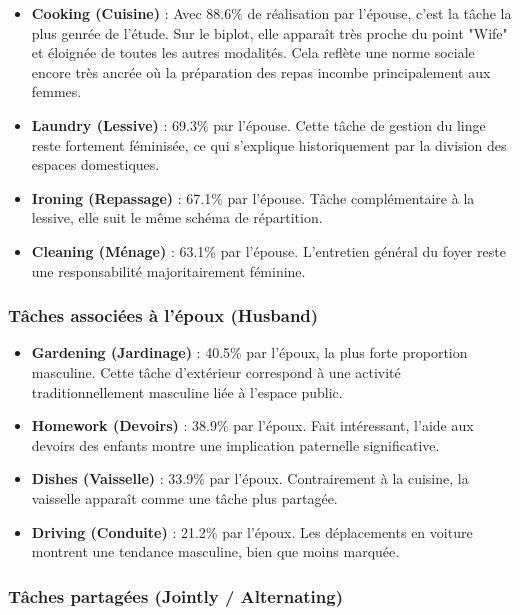 \documentclass[12pt,a4paper]{article}
\begin{document}
\begin{itemize}
    \item \textbf{Cooking (Cuisine)} : Avec 88.6\% de réalisation par l'épouse, c'est la tâche la plus genrée de l'étude. Sur le biplot, elle apparaît très proche du point "Wife" et éloignée de toutes les autres modalités. Cela reflète une norme sociale encore très ancrée où la préparation des repas incombe principalement aux femmes.
    
    \item \textbf{Laundry (Lessive)} : 69.3\% par l'épouse. Cette tâche de gestion du linge reste fortement féminisée, ce qui s'explique historiquement par la division des espaces domestiques.
    
    \item \textbf{Ironing (Repassage)} : 67.1\% par l'épouse. Tâche complémentaire à la lessive, elle suit le même schéma de répartition.
    
    \item \textbf{Cleaning (Ménage)} : 63.1\% par l'épouse. L'entretien général du foyer reste une responsabilité majoritairement féminine.
\end{itemize}

\subsubsection{Tâches associées à l'époux (Husband)}

\begin{itemize}
    \item \textbf{Gardening (Jardinage)} : 40.5\% par l'époux, la plus forte proportion masculine. Cette tâche d'extérieur correspond à une activité traditionnellement masculine liée à l'espace public.
    
    \item \textbf{Homework (Devoirs)} : 38.9\% par l'époux. Fait intéressant, l'aide aux devoirs des enfants montre une implication paternelle significative.
    
    \item \textbf{Dishes (Vaisselle)} : 33.9\% par l'époux. Contrairement à la cuisine, la vaisselle apparaît comme une tâche plus partagée.
    
    \item \textbf{Driving (Conduite)} : 21.2\% par l'époux. Les déplacements en voiture montrent une tendance masculine, bien que moins marquée.
\end{itemize}

\subsubsection{Tâches partagées (Jointly / Alternating)}
\end{document}
